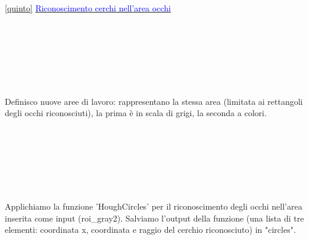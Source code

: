 \documentclass[12pt]{article}
\begin{document}
{ \ref {quinto} \underline{\textcolor{blue}{Riconoscimento cerchi nell'area occhi}}
  	\\
  	\\
  	\\
  	\\
  	 	
  	\\
  	\\
  	\\
  	\\
  	Definisco nuove aree di lavoro: rappresentano la stessa area (limitata ai rettangoli degli occhi riconosciuti), la prima è in scala di grigi, la seconda a colori.
  	\\
  	\\
  	\\
  	\\
  	\\
  	\\
  	\\
  	\\
  	 Applichiamo la funzione 'HoughCircles' per il riconoscimento degli occhi nell'area inserita come input (roi\_gray2). Salviamo l'output della funzione (una lista di tre elementi: coordinata x, coordinata  e raggio del cerchio riconosciuto) in "circles".
  	\\
  	\\
  	\\
  	\\
  	}
\end{document}
